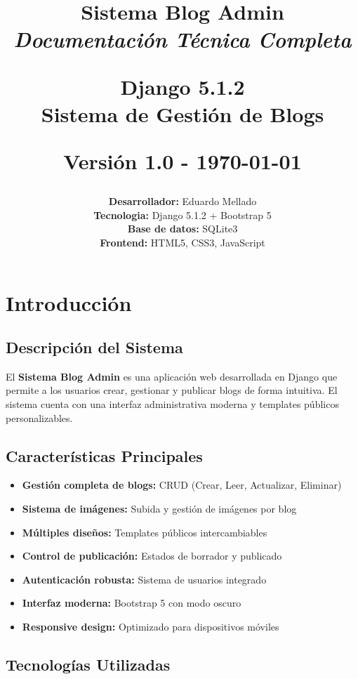 \documentclass[11pt,a4paper]{report}
\title{
	\vspace{-2cm}
	\begin{center}
		\Huge\textbf{Sistema Blog Admin}\\
		\Large\textit{Documentación Técnica Completa}\\
		\vspace{1cm}
		\begin{tcolorbox}[width=0.6\textwidth,colback=blue!10!white,colframe=blue!75!black]
			\centering
			\Large\textbf{Django 5.1.2}\\
			\large Sistema de Gestión de Blogs
		\end{tcolorbox}
		\vspace{0.5cm}
		\normalsize Versión 1.0 - \today
	\end{center}
}
\author{
	\textbf{Desarrollador:} Eduardo Mellado\\
	\textbf{Tecnologia:} Django 5.1.2 + Bootstrap 5\\
	\textbf{Base de datos:} SQLite3\\
	\textbf{Frontend:} HTML5, CSS3, JavaScript
}
\date{}
\begin{document}
	
	\maketitle
	\thispagestyle{empty}
	\newpage
	
	\tableofcontents
	\newpage
	
	\listoffigures
	\newpage
	
	\listoftables
	\newpage
	
	\section{Introducción}
	
	\subsection{Descripción del Sistema}
	El \textbf{Sistema Blog Admin} es una aplicación web desarrollada en Django que permite a los usuarios crear, gestionar y publicar blogs de forma intuitiva. El sistema cuenta con una interfaz administrativa moderna y templates públicos personalizables.
	
	\subsection{Características Principales}
	\begin{itemize}[leftmargin=1.5cm]
		\item \textbf{Gestión completa de blogs:} CRUD (Crear, Leer, Actualizar, Eliminar)
		\item \textbf{Sistema de imágenes:} Subida y gestión de imágenes por blog
		\item \textbf{Múltiples diseños:} Templates públicos intercambiables
		\item \textbf{Control de publicación:} Estados de borrador y publicado
		\item \textbf{Autenticación robusta:} Sistema de usuarios integrado
		\item \textbf{Interfaz moderna:} Bootstrap 5 con modo oscuro
		\item \textbf{Responsive design:} Optimizado para dispositivos móviles
	\end{itemize}
	
	\subsection{Tecnologías Utilizadas}
	
\end{document}
